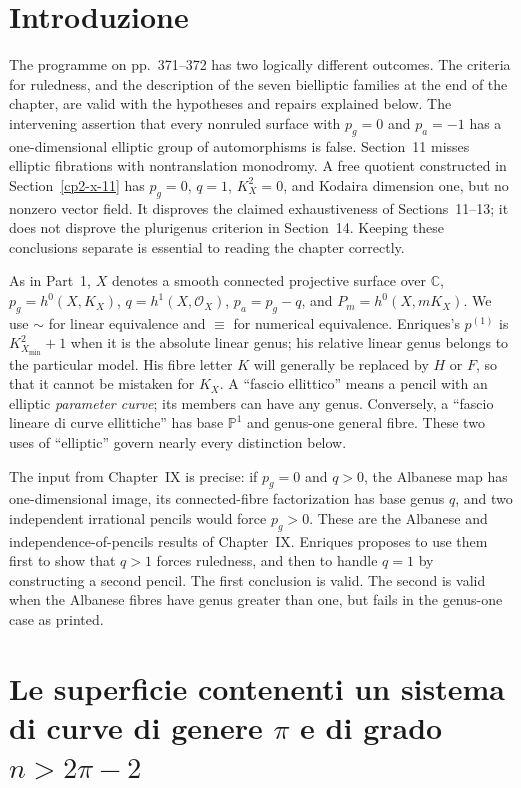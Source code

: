 \section{Introduzione}
\label{cp2-x-1}

The programme on pp.~371--372 has two logically different outcomes. The criteria for ruledness, and the description of the seven bielliptic families at the end of the chapter, are valid with the hypotheses and repairs explained below. The intervening assertion that every nonruled surface with $p_g=0$ and $p_a=-1$ has a one-dimensional elliptic group of automorphisms is false. Section~11 misses elliptic fibrations with nontranslation monodromy. A free quotient constructed in Section~\ref{cp2-x-11} has $p_g=0$, $q=1$, $K_X^2=0$, and Kodaira dimension one, but no nonzero vector field. It disproves the claimed exhaustiveness of Sections~11--13; it does not disprove the plurigenus criterion in Section~14. Keeping these conclusions separate is essential to reading the chapter correctly.

As in Part~1, $X$ denotes a smooth connected projective surface over $\mathbb C$, $p_g=h^0(X,K_X)$, $q=h^1(X,\mathcal O_X)$, $p_a=p_g-q$, and $P_m=h^0(X,mK_X)$. We use $\sim$ for linear equivalence and $\equiv$ for numerical equivalence. Enriques's $p^{(1)}$ is $K_{X_{\min}}^2+1$ when it is the absolute linear genus; his relative linear genus belongs to the particular model. His fibre letter $K$ will generally be replaced by $H$ or $F$, so that it cannot be mistaken for $K_X$. A ``fascio ellittico'' means a pencil with an elliptic \emph{parameter curve}; its members can have any genus. Conversely, a ``fascio lineare di curve ellittiche'' has base $\mathbb P^1$ and genus-one general fibre. These two uses of ``elliptic'' govern nearly every distinction below.

The input from Chapter~IX is precise: if $p_g=0$ and $q>0$, the Albanese map has one-dimensional image, its connected-fibre factorization has base genus $q$, and two independent irrational pencils would force $p_g>0$. These are the Albanese and independence-of-pencils results of Chapter~IX. Enriques proposes to use them first to show that $q>1$ forces ruledness, and then to handle $q=1$ by constructing a second pencil. The first conclusion is valid. The second is valid when the Albanese fibres have genus greater than one, but fails in the genus-one case as printed.

\section{Le superficie contenenti un sistema di curve di genere \texorpdfstring{$\pi$}{π} e di grado \texorpdfstring{$n>2\pi-2$}{n>2π−2}}
\label{cp2-x-2}

